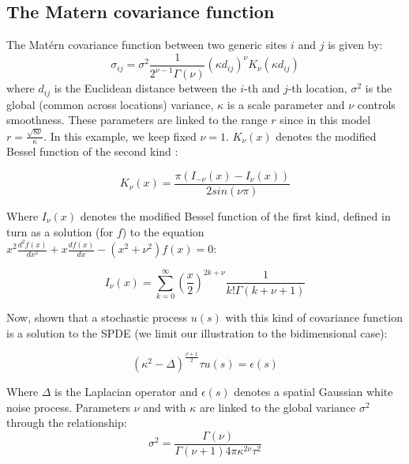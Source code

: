 \documentclass[openany, 11pt, oneside]{book}
\begin{document}
\begin{subappendices}
\section{The Matern covariance function} \label{appendix:Matern}
The Matérn covariance function between two generic sites $i$ and $j$ is given by:
%
\begin{equation}
\sigma_{ij} =\sigma^2 \frac{1}{2^{\nu-1}\Gamma(\nu)} \left(\kappa  d_{ij}\right)^{\nu}
K_{\nu}(\kappa d_{ij}) 
\label{eq:matern}
\end{equation}
%
where $d_{ij}$ is the Euclidean distance between the $i$-th and $j$-th location, $\sigma^2$ is the global (common across locations) variance, %
$\kappa$ is a scale parameter and $\nu$ controls smoothness. These parameters are linked to the range $r$ since in this model $r = \frac{\sqrt{8\nu}}{\kappa}$. In this example, we keep fixed $\nu = 1$.  $K_{\nu}(x)$ denotes the modified Bessel function of the second kind \parencite[][Section 9.6]{AS}:

$$
K_{\nu}(x) = \frac{\pi \left( I_{-\nu}(x) - I_{\nu}(x)\right)}{2 sin (\nu \pi)}
$$

Where $I_{\nu}(x)$ denotes the modified Bessel function of the first kind, defined in turn as a solution (for $f$) to the equation $x^2  \frac{d^2f(x)}{dx^2}+x\frac{df(x)}{dx} - (x^2+\nu^2)f(x) = 0$:

$$
I_{\nu}(x) = \sum_{k=0}^\infty \left( \frac{x}{2} \right)^{2k+\nu}\frac{1}{k! \Gamma(k+\nu+1)}
$$

Now, \cite{Whittle} shown that a stochastic process $u(s)$ with this kind of covariance function is a solution to the SPDE (we limit our illustration to the bidimensional case):

\begin{equation}
(\kappa^2 - \Delta)^{\frac{\nu + 1}{2}} \tau u(s) = \epsilon(s)
\label{spde}
\end{equation}

Where $\Delta$ is the Laplacian operator and $\epsilon(s)$ denotes a spatial Gaussian white noise process. Parameters $\nu$ and with $\kappa$ are linked to the global variance $\sigma^2$ through the relationship:
$$
\sigma^2 = \frac{\Gamma(\nu)}{\Gamma(\nu +1) 4 \pi \kappa^{2 \nu} \tau^2}
$$


\end{subappendices}


%
%
%
%
\end{document}
